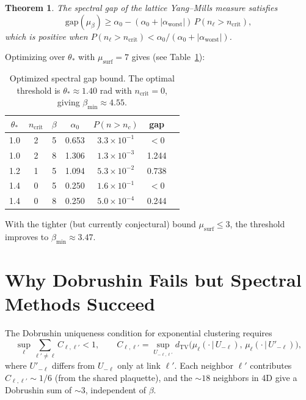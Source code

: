 \documentclass[11pt,a4paper]{article}
\theoremstyle{plain}
\newtheorem{theorem}{Theorem}[section]
\theoremstyle{definition}
\theoremstyle{remark}
\begin{document}
\begin{theorem}\label{thm:spectral-gap}
The spectral gap of the lattice Yang--Mills measure satisfies
\begin{equation}\label{eq:gap-bound}
  \mathrm{gap}(\mu_\beta)
  \geq \alpha_0 - (\alpha_0 + |\alpha_{\mathrm{worst}}|)\,
  P(n_\ell > n_{\mathrm{crit}}),
\end{equation}
which is positive when
$P(n_\ell > n_{\mathrm{crit}}) <
\alpha_0 / (\alpha_0 + |\alpha_{\mathrm{worst}}|)$.
\end{theorem}

Optimizing over $\theta_*$ with $\mu_{\mathrm{surf}} = 7$
gives (see Table~\ref{tab:optimization}):

\begin{table}[h]
\centering
\caption{Optimized spectral gap bound. The optimal threshold
is $\theta_* \approx 1.40$ rad with $n_{\mathrm{crit}} = 0$,
giving $\beta_{\min} \approx 4.55$.}
\label{tab:optimization}
\begin{tabular}{@{}ccccccc@{}}
\toprule
$\theta_*$ & $n_{\mathrm{crit}}$ & $\beta$ & $\alpha_0$ &
  $P(n > n_c)$ & gap \\
\midrule
1.0 & 2 & 5 &  0.653  & $3.3 \times 10^{-1}$ & $<0$ \\
1.0 & 2 & 8 &  1.306  & $1.3 \times 10^{-3}$ & 1.244 \\
1.2 & 1 & 5 &  1.094  & $5.3 \times 10^{-2}$ & 0.738 \\
1.4 & 0 & 5 &  0.250  & $1.6 \times 10^{-1}$ & $<0$ \\
1.4 & 0 & 8 &  0.250  & $5.0 \times 10^{-4}$ & 0.244 \\
\bottomrule
\end{tabular}
\end{table}

With the tighter (but currently conjectural) bound
$\mu_{\mathrm{surf}} \leq 3$, the threshold improves to
$\beta_{\min} \approx 3.47$.


\section{Why Dobrushin Fails but Spectral Methods Succeed}%
\label{sec:why}

The Dobrushin uniqueness condition for exponential clustering
requires
\begin{equation}\label{eq:dobrushin}
  \sup_\ell \sum_{\ell' \neq \ell} C_{\ell, \ell'} < 1,
  \qquad
  C_{\ell, \ell'} = \sup_{U_{-\ell,\ell'}}
  d_{\mathrm{TV}}\bigl(\mu_\ell(\cdot\,|\,U_{-\ell}),\,
  \mu_\ell(\cdot\,|\,U'_{-\ell})\bigr),
\end{equation}
where $U'_{-\ell}$ differs from $U_{-\ell}$ only at link $\ell'$.
Each neighbor $\ell'$ contributes $C_{\ell,\ell'} \sim 1/6$
(from the shared plaquette), and the $\sim 18$ neighbors in 4D
give a Dobrushin sum of $\sim 3$, independent of $\beta$.
\end{document}
